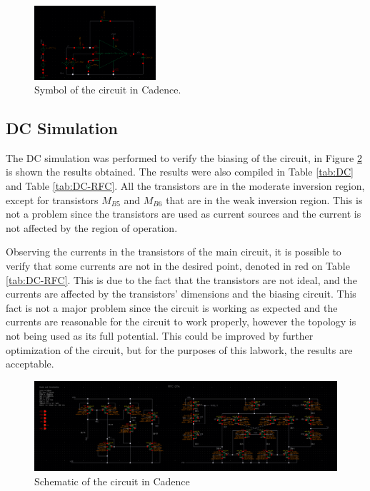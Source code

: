 \begin{figure}[H]
    \centering
    \includegraphics[width=0.4\textwidth]{Images/tb.png}
    \caption{Symbol of the circuit in Cadence.}
    \label{fig:Symbol}
\end{figure}

\subsection{DC Simulation}

The DC simulation was performed to verify the biasing of the circuit, in Figure \ref{fig:DC} is shown the results obtained. The results were also compiled in Table \ref{tab:DC} and Table \ref{tab:DC-RFC}. All the transistors are in the moderate inversion region, except for transistors $M_{B5}$ and $M_{B6}$ that are in the weak inversion region. This is not a problem since the transistors are used as current sources and the current is not affected by the region of operation.

Observing the currents in the transistors of the main circuit, it is possible to verify that some currents are not in the desired point, denoted in red on Table \ref{tab:DC-RFC}. This is due to the fact that the transistors are not ideal, and the currents are affected by the transistors' dimensions and the biasing circuit. This fact is not a major problem since the circuit is working as expected and the currents are reasonable for the circuit to work properly, however the topology is not being used as its full potential. This could be improved by further optimization of the circuit, but for the purposes of this labwork, the results are acceptable.

\begin{figure}[H]
    \centering
    \includegraphics[width=1\textwidth]{Images/OP.png}
    \caption{Schematic of the circuit in Cadence}
    \label{fig:DC}
\end{figure}

